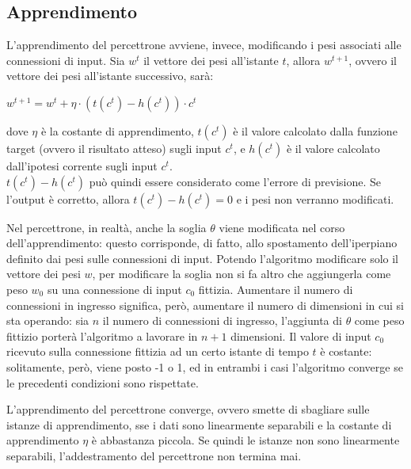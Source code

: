 \subsection{Apprendimento}
L'apprendimento del percettrone avviene, invece, modificando i pesi associati
alle connessioni di input.
Sia $w^t$ il vettore dei pesi all'istante $t$, allora $w^{t+1}$, ovvero il
vettore dei pesi all'istante successivo, sarà:
\begin{center}
    $w^{t+1} = w^t + \eta \cdot (t(c^t) - h(c^t)) \cdot c^t$
\end{center}
dove $\eta$ è la costante di apprendimento, $t(c^t)$ è il valore calcolato dalla
funzione target (ovvero il risultato atteso) sugli input $c^t$, e $h(c^t)$ è il
valore calcolato dall'ipotesi corrente sugli input $c^t$.\\
$t(c^t) - h(c^t)$ può quindi essere considerato come l'errore di previsione. Se
l'output è corretto, allora $t(c^t) - h(c^t) = 0$ e i pesi non verranno
modificati.

Nel percettrone, in realtà, anche la soglia $\theta$ viene modificata nel corso
dell'apprendimento: questo corrisponde, di fatto, allo spostamento
dell'iperpiano definito dai pesi sulle connessioni di input.
Potendo l'algoritmo modificare solo il vettore dei pesi $w$, per modificare la
soglia non si fa altro che aggiungerla come peso $w_0$ su una connessione di
input $c_0$ fittizia. Aumentare il numero di connessioni in ingresso significa,
però, aumentare il numero di dimensioni in cui si sta operando: sia $n$ il
numero di connessioni di ingresso, l'aggiunta di $\theta$ come peso fittizio
porterà l'algoritmo a lavorare in $n+1$ dimensioni.
Il valore di input $c_0$ ricevuto sulla connessione fittizia ad un certo istante
di tempo $t$ è costante: solitamente, però, viene posto -1 o 1, ed in entrambi i
casi l'algoritmo converge se le precedenti condizioni sono rispettate.

L'apprendimento del percettrone converge, ovvero smette di sbagliare sulle
istanze di apprendimento, sse i dati sono linearmente separabili e la costante
di apprendimento $\eta$ è abbastanza piccola.
Se quindi le istanze non sono linearmente separabili, l'addestramento del
percettrone non termina mai.

